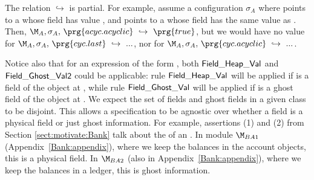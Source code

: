 The relation $ \hookrightarrow$ is partial. 
For example, assume   a configuration
$\sigma_A$ where
 points to a  whose field  has value , and   
 points to a  whose field  has the same value as . Then,   
$\M_A,\sigma_A,\,\prg{acyc.acyclic}  \ \hookrightarrow\  \prg{true}$, but we would have no value for 
$\M_A,\sigma_A,\, \prg{cyc.last}  \ \hookrightarrow\  ...$, nor for
$\M_A,\sigma_A,\, \prg{cyc.acyclic}  \ \hookrightarrow\  ...$.

Notice also that for an expression of the form  
, both ${\sf {Field\_Heap\_Val}}$ and ${\sf {Field\_Ghost\_Val2}}$ could be applicable: rule ${\sf {Field\_Heap\_Val}}$
will be applied if  is a field of the object at , while rule ${\sf {Field\_Ghost\_Val}}$
will be applied if  is a ghost field of the object at . We expect the set of fields and ghost fields in a 
given class to be disjoint.
This allows a specification to be agnostic over whether a field is a physical field or just ghost information.
For example, assertions (1) and (2) from  Section  \ref{sect:motivate:Bank}
 talk about the  of an . 
In module $\M_{BA1}$ (Appendix~\ref{Bank:appendix}), where we keep the balances in the account objects, this is a physical field. 
In $\M_{BA2}$ (also in Appendix~\ref{Bank:appendix}), where we keep the
balances in a ledger, this is ghost information.  

